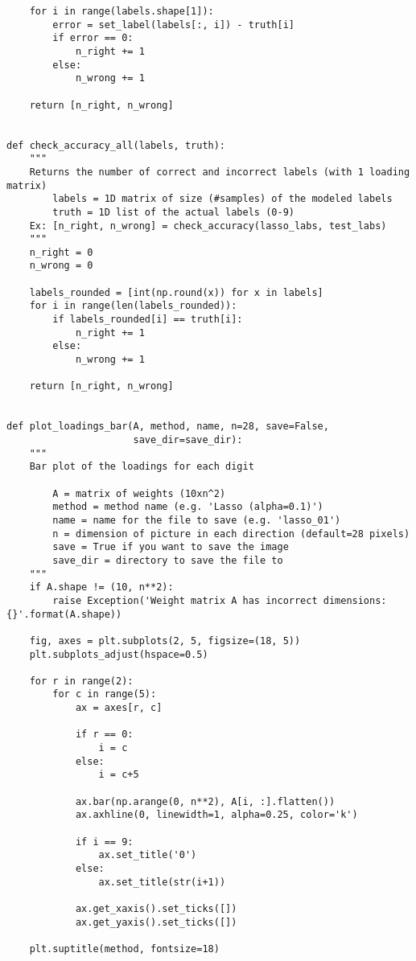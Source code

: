 \documentclass[10pt]{article}
\begin{document}
\begin{lstlisting}
    for i in range(labels.shape[1]):
        error = set_label(labels[:, i]) - truth[i]
        if error == 0:
            n_right += 1
        else:
            n_wrong += 1
            
    return [n_right, n_wrong]


def check_accuracy_all(labels, truth):
    """
    Returns the number of correct and incorrect labels (with 1 loading matrix)
        labels = 1D matrix of size (#samples) of the modeled labels
        truth = 1D list of the actual labels (0-9)
    Ex: [n_right, n_wrong] = check_accuracy(lasso_labs, test_labs)
    """
    n_right = 0
    n_wrong = 0
    
    labels_rounded = [int(np.round(x)) for x in labels]
    for i in range(len(labels_rounded)):
        if labels_rounded[i] == truth[i]:
            n_right += 1
        else:
            n_wrong += 1
            
    return [n_right, n_wrong]


def plot_loadings_bar(A, method, name, n=28, save=False,
                      save_dir=save_dir):
    """
    Bar plot of the loadings for each digit
    
        A = matrix of weights (10xn^2)
        method = method name (e.g. 'Lasso (alpha=0.1)')
        name = name for the file to save (e.g. 'lasso_01')
        n = dimension of picture in each direction (default=28 pixels)
        save = True if you want to save the image
        save_dir = directory to save the file to
    """
    if A.shape != (10, n**2):
        raise Exception('Weight matrix A has incorrect dimensions: {}'.format(A.shape))
    
    fig, axes = plt.subplots(2, 5, figsize=(18, 5))
    plt.subplots_adjust(hspace=0.5)
    
    for r in range(2):
        for c in range(5):
            ax = axes[r, c]
            
            if r == 0:
                i = c
            else:
                i = c+5
        
            ax.bar(np.arange(0, n**2), A[i, :].flatten())
            ax.axhline(0, linewidth=1, alpha=0.25, color='k')

            if i == 9:
                ax.set_title('0')
            else:
                ax.set_title(str(i+1))

            ax.get_xaxis().set_ticks([])
            ax.get_yaxis().set_ticks([])

    plt.suptitle(method, fontsize=18)
    

\end{lstlisting}
\end{document}
